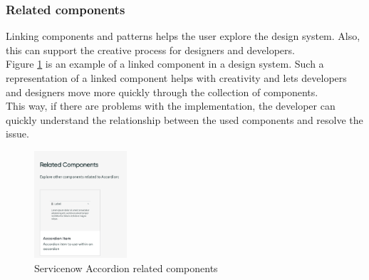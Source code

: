 \subsubsection{Related components} Linking components and patterns helps the user explore the design system. Also, this can support the creative process for designers and developers. \\
Figure \ref{servicenow_accordion} is an example of a linked component in a design system. Such a representation of a linked component helps with creativity and lets developers and designers move more quickly through the collection of components. \\
This way, if there are problems with the implementation, the developer can quickly understand the relationship between the used components and resolve the issue. \cite{vesselov_building_2019}
\begin{figure}[htbp]
\centerline{\includegraphics[height=150px]{images/servicenow_accordion_related.png}}
\caption{Servicenow Accordion related components \cite{servicenow_servicenow_nodate}}
\label{servicenow_accordion}
\end{figure}

